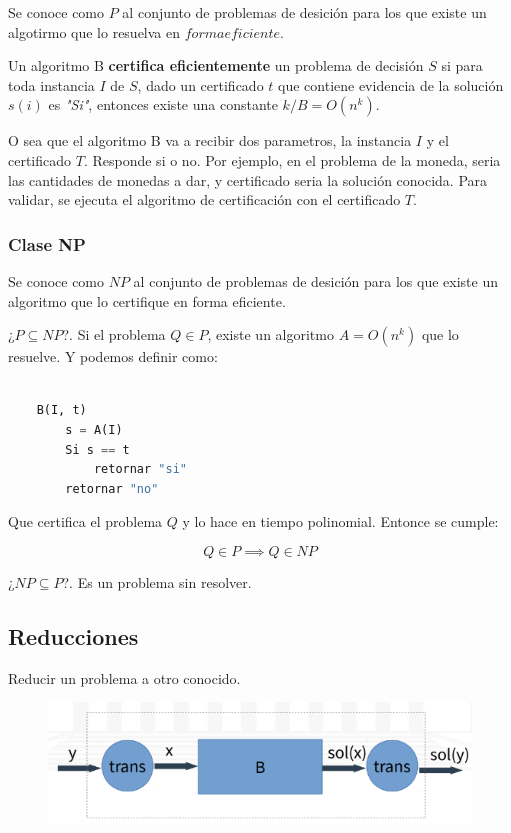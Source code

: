 \documentclass{article}
\begin{document}
Se conoce como \(P\) al conjunto de problemas de desición para los que existe un algotirmo que lo resuelva en
\(forma eficiente\).

Un algoritmo B \textbf{certifica eficientemente} un problema de decisión \(S\)  si para toda instancia \(I\) de \(S\),
dado un certificado \(t\) que contiene evidencia de la solución \(s(i)\) es \textit{"Si"}, 
entonces existe una constante \(k / B = O(n^k)\). 

O sea que el algoritmo B va a recibir dos parametros, la instancia \(I\) y el certificado \(T\).  
Responde si o no. Por ejemplo, en el problema de la moneda, seria las cantidades de monedas a dar, 
y certificado seria la solución conocida. Para validar, se ejecuta el algoritmo de certificación
con el certificado \(T\).


\subsubsection{Clase NP}

Se conoce como \(NP\) al conjunto de problemas de desición para los que existe un algoritmo
que lo certifique en forma eficiente.


¿\(P \subseteq NP\)?. Si el problema \(Q \in P\), existe un algoritmo \( A = O(n^k)\) que lo resuelve. Y podemos definir como:

\begin{lstlisting}[language=Python, caption=Algoritmo B]

    B(I, t)
        s = A(I)
        Si s == t
            retornar "si"
        retornar "no"

\end{lstlisting}

Que certifica el problema \(Q\) y lo hace en tiempo polinomial. Entonce se cumple:

\[
    Q \in P \implies Q \in NP
\]

¿\(NP \subseteq P\)?. Es un problema sin resolver.


\subsection{Reducciones}

Reducir un problema a otro conocido.

\begin{figure}[h!]
    \includegraphics[width=\linewidth]{imagenes/reduccion.png}
\end{figure}
\end{document}

